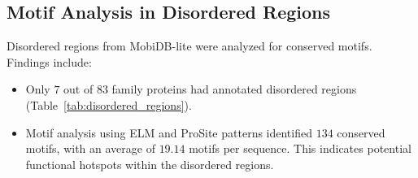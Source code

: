 \subsection{Motif Analysis in Disordered Regions}
Disordered regions from MobiDB-lite were analyzed for conserved motifs. Findings include:
\begin{itemize}
    \item Only $7$ out of $83$ family proteins had annotated disordered regions (Table~\ref{tab:disordered_regions}).
    \item Motif analysis using ELM and ProSite patterns identified $134$ conserved motifs, with an average of $19.14$ motifs per sequence. This indicates potential functional hotspots within the disordered regions.
\end{itemize}